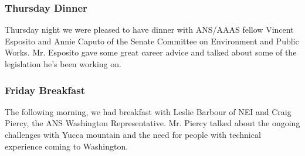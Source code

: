 \subsubsection*{Thursday Dinner}

Thursday night we were pleased to have dinner with ANS/AAAS fellow Vincent
Esposito and Annie Caputo of the Senate Committee on Environment and Public
Works. Mr. Esposito gave some great career advice and talked about some of the
legislation he’s been working on.  

\subsubsection*{Friday Breakfast}

The following morning, we had breakfast with Leslie Barbour of NEI and Craig
Piercy, the ANS Washington Representative. Mr. Piercy talked about the ongoing
challenges with Yucca mountain and the need for people with technical experience
coming to Washington.
